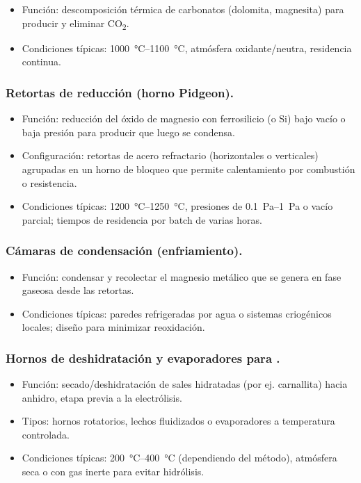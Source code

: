 \documentclass[12pt,a4paper]{article}
\begin{document}
\begin{itemize}
  \item Función: descomposición térmica de carbonatos (dolomita, magnesita) para producir  y eliminar CO\textsubscript{2}.
  \item Condiciones típicas: \SIrange{1000}{1100}{\celsius}, atmósfera oxidante/neutra, residencia continua.
\end{itemize}

\subsubsection{Retortas de reducción (horno Pidgeon).}

\begin{itemize}
  \item Función: reducción del óxido de magnesio con ferrosilicio (o Si) bajo vacío o baja presión para producir  que luego se condensa.
  \item Configuración: retortas de acero refractario (horizontales o verticales) agrupadas en un horno de bloqueo que permite calentamiento por combustión o resistencia.
  \item Condiciones típicas: \SIrange{1200}{1250}{\celsius}, presiones de \SIrange[range-units=single]{0.1}{1}{\pascal} o vacío parcial; tiempos de residencia por batch de varias horas.
\end{itemize}

\subsubsection{Cámaras de condensación (enfriamiento).}

\begin{itemize}
  \item Función: condensar y recolectar el magnesio metálico que se genera en fase gaseosa desde las retortas.
  \item Condiciones típicas: paredes refrigeradas por agua o sistemas criogénicos locales; diseño para minimizar reoxidación.
\end{itemize}

\subsubsection{Hornos de deshidratación y evaporadores para .}

\begin{itemize}
  \item Función: secado/deshidratación de sales hidratadas (por ej. carnallita) hacia  anhidro, etapa previa a la electrólisis.
  \item Tipos: hornos rotatorios, lechos fluidizados o evaporadores a temperatura controlada.
  \item Condiciones típicas: \SIrange[range-phrase = { - }, range-units=single]{200}{400}{\celsius} (dependiendo del método), atmósfera seca o con gas inerte para evitar hidrólisis.
\end{itemize}
\end{document}
